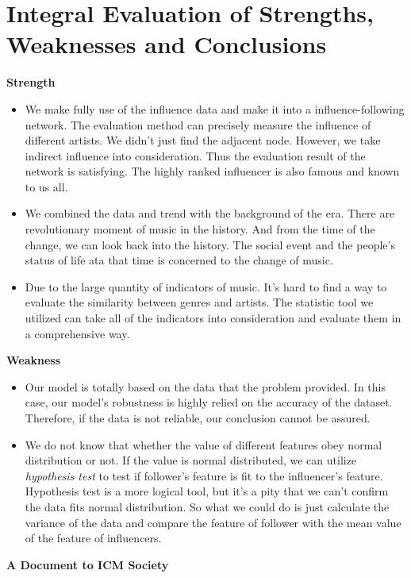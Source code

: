 \documentclass[12pt]{article}
\begin{document}
\section{Integral Evaluation of Strengths, Weaknesses and Conclusions}
\begin{large}
\textbf{Strength}
\end{large}
\begin{itemize}
\item We make fully use of the influence data and make it into a influence-following network. The evaluation method 
can precisely measure the influence of different artists. We didn't just find the adjacent node. However, we take indirect
influence into consideration. Thus the evaluation result of the network is satisfying. The highly ranked influencer is 
 also famous and known to us all.
\end{itemize}
\begin{itemize}
\item We combined the data and trend with the background of the era. There are revolutionary moment of music
 in the history. And from the time of the change, we can look back into the history. The social event and the people's status of life ata that
time is concerned to the change of music.
\end{itemize}
\begin{itemize}
\item Due to the large quantity of indicators of music. It's hard to find a way to evaluate the similarity between genres and artists.
 The statistic tool we utilized can take all of the indicators into consideration and evaluate them in a comprehensive way.
\end{itemize}
\begin{large}
\textbf{Weakness}
\end{large}
\begin{itemize}
\item Our model is totally based on the data that the problem provided. In this case, our model's robustness is highly relied on
the accuracy of the dataset. Therefore, if the data is not reliable, our conclusion cannot be assured.
\end{itemize}
\begin{itemize}
\item We do not know that whether the value of different features obey normal distribution or not. If the value is normal distributed, we can utilize \textit{hypothesis test} to test if follower's feature is fit to the influencer's feature. Hypothesis test is a more logical tool, but it's a
pity that we can't confirm the data fits normal distribution. So what we could do is just calculate the variance of the data and compare the feature
of follower with the mean value of the feature of influencers.
\end{itemize}
\begin{center}\textbf{A Document to ICM Society}
\end{center}
\end{document}
